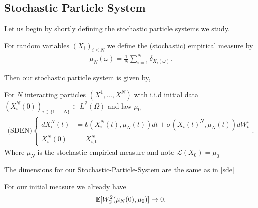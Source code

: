 \subsection{Stochastic Particle System}
Let us begin by shortly defining the stochastic particle systems we study. 
\begin{definition}\label{empirical_stochastic}
  For random variables $(X_i)_{i\le N}$  we define the (stochastic) empirical measure by
  \begin{align*}
    \mu_N(\omega ) = \frac{1}{N}\sum_{i=1}^{N} \delta_{X_i(\omega)} 
  .\end{align*}
\end{definition}
Then our stochastic particle system is given by,
\begin{definition}\label{sden}
  For $N$ interacting particles $(X^{1} ,\ldots ,X^{N} )$ with i.i.d initial data $(X_i^{N}(0))_{i \in  \{1,\ldots ,N\}  } \subset  L^2(\Omega) $ and law $\mu_0$
\begin{align*}
  \text{(SDEN)}\begin{cases}
    d X_i^{N}(t) &=   b(X_i^{N}(t) , \mu_N(t) )dt + \sigma(X_i(t)^{N},\mu_N(t))dW^{i}_t \\
    X_i^{N}(0) &= X_{i,0}^{N}   
  \end{cases}
.\end{align*}
Where $\mu_N$ is the stochastic empirical measure and note $\mathcal{L}(X_{0}) = \mu_0$
\end{definition}
\begin{remark}
  The dimensions for our Stochastic-Particle-System are the same as in \autoref{sde}
\end{remark}
\begin{remark}
  For our initial measure we already have
\begin{align*}
  \mathbb{E}[W_2^{2}(\mu_N(0),\mu_0) ] \to  0
.\end{align*}
\end{remark}
